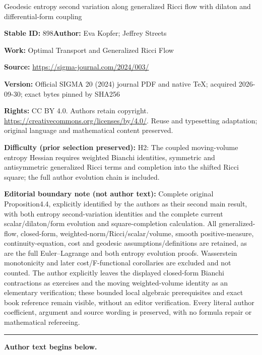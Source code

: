 \documentclass[11pt]{article}
\numberwithin{equation}{section}
\numberwithin{equation}{section}
\begin{document}
\begin{center}\Large Geodesic entropy second variation along generalized Ricci flow with dilaton and differential-form coupling\end{center}
\noindent\textbf{Stable ID:} 898\quad\textbf{Author:} Eva Kopfer; Jeffrey Streets\par
\noindent\textbf{Work:} Optimal Transport and Generalized Ricci Flow\par
\noindent\textbf{Source:} \url{https://sigma-journal.com/2024/003/}\par
\noindent\textbf{Version:} Official SIGMA 20 (2024) journal PDF and native TeX; acquired 2026-09-30; exact bytes pinned by SHA256\par
\noindent\textbf{Rights:} CC BY 4.0. Authors retain copyright. \url{https://creativecommons.org/licenses/by/4.0/}. Reuse and typesetting adaptation; original language and mathematical content preserved.\par
\noindent\textbf{Difficulty (prior selection preserved):} {\CJKfont H2: The coupled moving-volume entropy Hessian requires weighted Bianchi identities, symmetric and antisymmetric generalized Ricci terms and completion into the shifted Ricci square; the full author evolution chain is included.}\par
\medskip\noindent\textbf{Editorial boundary note (not author text):} Complete original Proposition4.4, explicitly identified by the authors as their second main result, with both entropy second-variation identities and the complete current scalar/dilaton/form evolution and square-completion calculation. All generalized-flow, closed-form, weighted-norm/Ricci/scalar/volume, smooth positive-measure, continuity-equation, cost and geodesic assumptions/definitions are retained, as are the full Euler–Lagrange and both entropy evolution proofs. Wasserstein monotonicity and later cost/F-functional corollaries are excluded and not counted. The author explicitly leaves the displayed closed-form Bianchi contractions as exercises and the moving weighted-volume identity as an elementary verification; these bounded local algebraic prerequisites and exact book reference remain visible, without an editor verification. Every literal author coefficient, argument and source wording is preserved, with no formula repair or mathematical refereeing.\par
\medskip\hrule\medskip\noindent\textbf{Author text begins below.}\par

\end{document}
